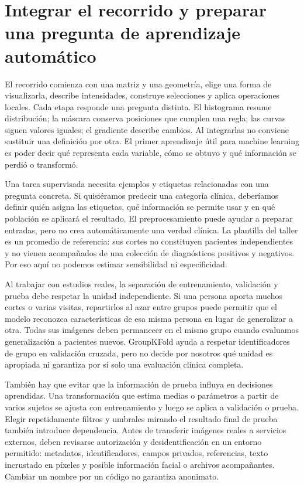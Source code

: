 \label{cap:ml}

\section{Integrar el recorrido y preparar una pregunta de aprendizaje automático}


El recorrido comienza con una matriz y una geometría, elige una forma de visualizarla, describe intensidades, construye selecciones y aplica operaciones locales. Cada etapa responde una pregunta distinta. El histograma resume distribución; la máscara conserva posiciones que cumplen una regla; las curvas siguen valores iguales; el gradiente describe cambios. Al integrarlas no conviene sustituir una definición por otra. El primer aprendizaje útil para machine learning es poder decir qué representa cada variable, cómo se obtuvo y qué información se perdió o transformó.


Una tarea supervisada necesita ejemplos y etiquetas relacionadas con una pregunta concreta. Si quisiéramos predecir una categoría clínica, deberíamos definir quién asigna las etiquetas, qué información se permite usar y en qué población se aplicará el resultado. El preprocesamiento puede ayudar a preparar entradas, pero no crea automáticamente una verdad clínica. La plantilla del taller es un promedio de referencia: sus cortes no constituyen pacientes independientes y no vienen acompañados de una colección de diagnósticos positivos y negativos. Por eso aquí no podemos estimar sensibilidad ni especificidad.


Al trabajar con estudios reales, la separación de entrenamiento, validación y prueba debe respetar la unidad independiente. Si una persona aporta muchos cortes o varias visitas, repartirlos al azar entre grupos puede permitir que el modelo reconozca características de esa misma persona en lugar de generalizar a otra. Todas sus imágenes deben permanecer en el mismo grupo cuando evaluamos generalización a pacientes nuevos. GroupKFold ayuda a respetar identificadores de grupo en validación cruzada, pero no decide por nosotros qué unidad es apropiada ni garantiza por sí solo una evaluación clínica completa.


También hay que evitar que la información de prueba influya en decisiones aprendidas. Una transformación que estima medias o parámetros a partir de varios sujetos se ajusta con entrenamiento y luego se aplica a validación o prueba. Elegir repetidamente filtros y umbrales mirando el resultado final de prueba también introduce dependencia. Antes de transferir imágenes reales a servicios externos, deben revisarse autorización y desidentificación en un entorno permitido: metadatos, identificadores, campos privados, referencias, texto incrustado en píxeles y posible información facial o archivos acompañantes. Cambiar un nombre por un código no garantiza anonimato.


